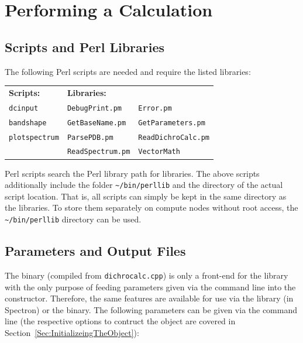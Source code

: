\documentclass[11pt, letterpaper]{article}
\begin{document}

\section{Performing a Calculation}

\subsection{Scripts and Perl Libraries}

The following Perl scripts are needed and require the listed libraries:

\begin{tabular*}{\textwidth}{@{\extracolsep{\fill}}lll}
\textbf{Scripts:}      &  \textbf{Libraries:}    &                           \\
\verb'dcinput'         & \verb'DebugPrint.pm'    & \verb'Error.pm'           \\
\verb'bandshape'       & \verb'GetBaseName.pm'   & \verb'GetParameters.pm'   \\
\verb'plotspectrum'    & \verb'ParsePDB.pm'      & \verb'ReadDichroCalc.pm'  \\
                       & \verb'ReadSpectrum.pm'  & \verb'VectorMath'         \\
\end{tabular*}

Perl scripts search the Perl library path for libraries. The above scripts additionally include the folder \verb'~/bin/perllib' and the directory of the actual script location. That is, all scripts can simply be kept in the same directory as the libraries. To store them separately on compute nodes without root access, the \verb'~/bin/perllib' directory can be used.




\subsection{Parameters and Output Files}

The binary (compiled from \verb'dichrocalc.cpp') is only a front-end for the library with the only purpose of feeding parameters given via the command line into the constructor. Therefore, the same features are available for use via the library (in Spectron) or the binary. The following parameters can be given via the command line (the respective options to contruct the object are covered in Section~\ref{Sec:InitializeingTheObject}):
\end{document}
